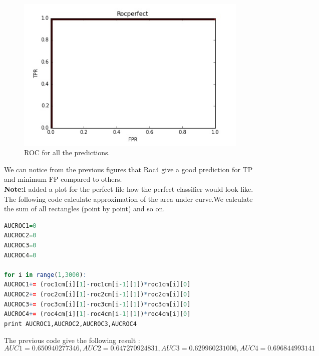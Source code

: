 \documentclass{article}
\begin{document}
\begin{figure}[H]
	\begin{center}
	\includegraphics[scale=0.58]{rocperfect.jpg}
	\end{center}

	\caption{ROC for all the predictions.}
\end{figure}
We can notice from the previous figures that Roc4 give a good prediction for TP and minimum FP compared to others.\\
\textbf{Note:}I added a plot for the perfect file how the perfect classifier would look like.
The following code calculate approximation of the area under curve.We calculate the sum of all rectangles (point by point) and so on.
\begin{lstlisting}[language=R]
AUCROC1=0
AUCROC2=0
AUCROC3=0
AUCROC4=0

for i in range(1,3000):
AUCROC1+= (roc1cm[i][1]-roc1cm[i-1][1])*roc1cm[i][0]
AUCROC2+= (roc2cm[i][1]-roc2cm[i-1][1])*roc2cm[i][0]
AUCROC3+= (roc3cm[i][1]-roc3cm[i-1][1])*roc3cm[i][0]
AUCROC4+= (roc4cm[i][1]-roc4cm[i-1][1])*roc4cm[i][0]
print AUCROC1,AUCROC2,AUCROC3,AUCROC4
\end{lstlisting}
The previous code give the following result :
\[AUC1=0.650940277346,AUC2= 0.647270924831,AUC3= 0.629960231006,AUC4= 0.696844993141\]
\end{document}
